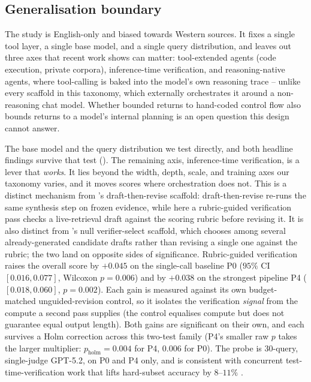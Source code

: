 \documentclass[11pt]{article}
\begin{document}
\subsection{Generalisation boundary}\label{sec:genbound}
The study is English-only and biased towards Western sources. It fixes a single tool layer, a
single base model, and a single query distribution, and leaves out three axes that
recent work shows can matter: tool-extended agents (code execution, private corpora),
inference-time verification, and reasoning-native agents, where tool-calling is baked
into the model's own reasoning trace -- unlike every scaffold in this taxonomy, which
externally orchestrates it around a non-reasoning chat model. Whether bounded returns
to hand-coded control flow also bounds returns to a model's internal planning is an open
question this design cannot answer.

The base
model and the query distribution we test directly, and both headline findings survive that
test (). The remaining axis, inference-time verification, is a lever
that \emph{works}. It lies beyond the width, depth, scale, and training axes
our taxonomy varies, and it moves scores where orchestration does not. This is a distinct
mechanism from 's draft-then-revise scaffold: draft-then-revise
re-runs the same synthesis step on frozen evidence, while here a rubric-guided verification
pass checks a live-retrieval draft against the scoring rubric before revising it. It is also
distinct from 's null verifier-select scaffold, which chooses among
several already-generated candidate drafts rather than revising a single one against the
rubric; the two land on opposite sides of significance.
Rubric-guided verification raises the overall score by $+0.045$ on the single-call baseline P0 ($95\%$ CI
$[0.016,0.077]$, Wilcoxon $p{=}0.006$) and by $+0.038$ on the
strongest pipeline P4 ($[0.018,0.060]$, $p{=}0.002$). Each gain is measured against its own
budget-matched unguided-revision control, so it isolates the verification \emph{signal}
from the compute a second pass supplies (the control equalises compute but does not
guarantee equal output length). Both gains are significant on their own, and each
survives a Holm correction across this two-test family
(P4's smaller raw $p$ takes the larger multiplier: $p_{\text{holm}}=0.004$ for P4, $0.006$ for
P0). The probe is $30$-query, single-judge GPT-5.2,
on P0 and P4 only, and is consistent with concurrent test-time-verification work
that lifts hard-subset accuracy by $8$--$11\%$ \citep{deepverifier2026}.
\end{document}
